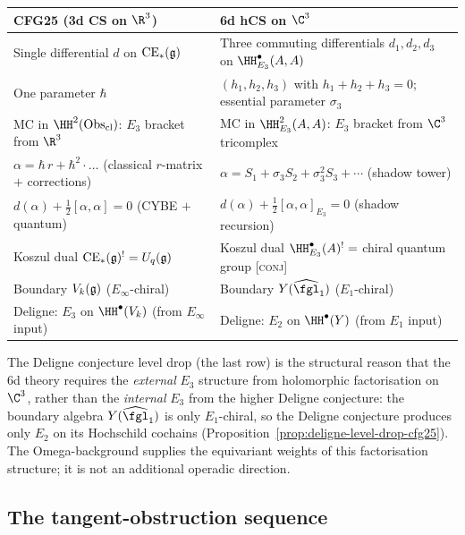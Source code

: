 \begin{center}
\small
\renewcommand{\arraystretch}{1.3}
\begin{tabular}{p{4.5cm}p{6cm}}
\toprule
\textbf{CFG25 (3d CS on $\R^3$)} & \textbf{6d hCS on $\C^3$} \\
\midrule
Single differential $d$ on $\mathrm{CE}_*(\frak{g})$ & Three commuting differentials $d_1, d_2, d_3$ on $\HH^\bullet_{E_3}(A, A)$ \\
One parameter $\hbar$ & $(h_1, h_2, h_3)$ with $h_1 + h_2 + h_3 = 0$; essential parameter $\sigma_3$ \\
MC in $\HH^2(\mathrm{Obs}_{\mathrm{cl}})$: $E_3$ bracket from $\R^3$ & MC in $\HH^2_{E_3}(A, A)$: $E_3$ bracket from $\C^3$ tricomplex \\
$\alpha = \hbar\, r + \hbar^2 \cdot \ldots$ (classical $r$-matrix $+$ corrections) & $\alpha = S_1 + \sigma_3 S_2 + \sigma_3^2 S_3 + \cdots$ (shadow tower) \\
$d(\alpha) + \tfrac{1}{2}[\alpha,\alpha] = 0$ (CYBE $+$ quantum) & $d(\alpha) + \tfrac{1}{2}[\alpha,\alpha]_{E_3} = 0$ (shadow recursion) \\
Koszul dual $\mathrm{CE}_*(\frak{g})^! = U_q(\frak{g})$ & Koszul dual $\HH^\bullet_{E_3}(A)^! =$ chiral quantum group [\textsc{conj}] \\
Boundary $V_k(\frak{g})$ ($E_\infty$-chiral) & Boundary $Y(\widehat{\fgl}_1)$ ($E_1$-chiral) \\
Deligne: $E_3$ on $\HH^\bullet(V_k)$ (from $E_\infty$ input) & Deligne: $E_2$ on $\HH^\bullet(Y)$ (from $E_1$ input) \\
\bottomrule
\end{tabular}
\end{center}

The Deligne conjecture level drop (the last row) is the structural
reason that the 6d theory requires the \emph{external} \(E_3\) structure
from holomorphic factorisation on \(\C^3\), rather than the
\emph{internal} \(E_3\) from the higher Deligne conjecture: the boundary
algebra \(Y(\widehat{\fgl}_1)\) is only \(E_1\)-chiral, so the Deligne
conjecture produces only \(E_2\) on its Hochschild cochains
(Proposition~\ref{prop:deligne-level-drop-cfg25}).  The
Omega-background supplies the equivariant weights of this factorisation
structure; it is not an additional operadic direction.

\subsection{The tangent-obstruction sequence}
\label{subsec:e3-tangent-obstruction}


